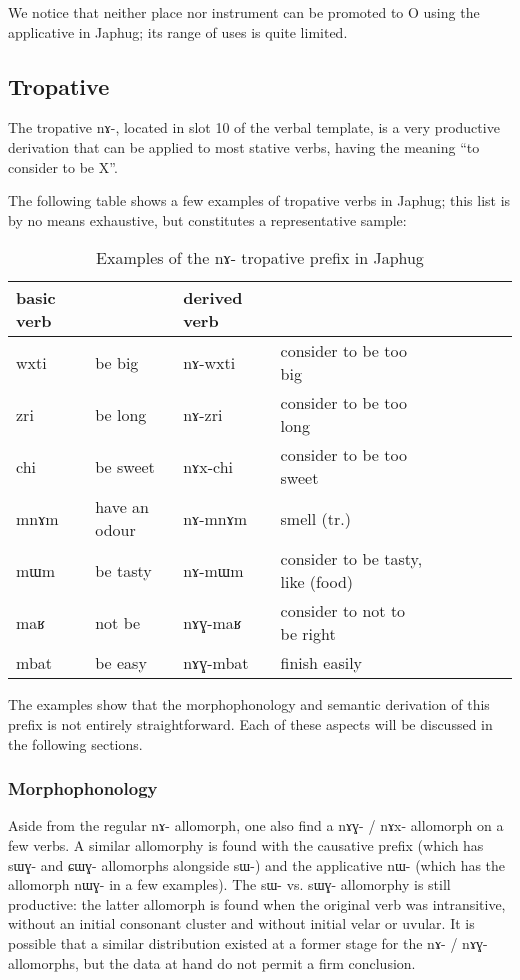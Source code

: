 \documentclass[oldfontcommands,oneside,a4paper,11pt]{memoir}
\newcommand{\ipa}[1]{{\phon #1}} %
\begin{document}
We notice that neither place nor instrument can be promoted to O using the applicative in Japhug; its range of uses is quite limited.

\subsection{Tropative} \label{sub:tropative}
The tropative \ipa{nɤ-}, located in slot 10 of the verbal template, is a very productive derivation that can be applied to most stative verbs, having the meaning ``to consider to be X''. 

The following table shows a few examples of tropative verbs in Japhug; this list is by no means exhaustive, but constitutes a representative sample:
\begin{table}[H]
\caption{Examples of the \ipa{nɤ}- tropative prefix in Japhug}\label{tab:tropative}
\begin{tabular}{lllllllll} \toprule
basic verb  & &derived  verb &\\
\midrule
 \ipa{wxti} & be big & \ipa{nɤ-wxti} & consider to be too big \\
 \ipa{zri} & be long & \ipa{nɤ-zri} & consider to be too long \\
  \ipa{chi} &be sweet & \ipa{nɤx-chi} &consider to be too sweet \\
    \ipa{mnɤm} & have an odour & \ipa{nɤ-mnɤm} & smell (tr.) \\
     \ipa{mɯm} & be tasty & \ipa{nɤ-mɯm} & consider to be tasty, like (food) \\
      \midrule
  \ipa{maʁ} & not be & \ipa{nɤɣ-maʁ} & consider to not to be right \\
  \ipa{mbat} & be easy & \ipa{nɤɣ-mbat} & finish easily \\
\bottomrule
\end{tabular}
\end{table}
The examples show that the morphophonology and semantic derivation of this prefix is not entirely straightforward. Each of these aspects will be discussed in the following sections.

\subsubsection{Morphophonology}


Aside from the regular \ipa{nɤ-} allomorph, one also find a \ipa{nɤɣ-} / \ipa{nɤx-} allomorph on a few verbs. A similar allomorphy is found with the causative prefix (which has \ipa{sɯɣ-} and \ipa{ɕɯɣ-} allomorphs alongside \ipa{sɯ-}) and the applicative \ipa{nɯ-} (which has the allomorph \ipa{nɯɣ-} in a few examples). The  \ipa{sɯ-} vs. \ipa{sɯɣ-} allomorphy is still productive: the latter allomorph is found when the original verb was intransitive, without an initial consonant cluster and without initial velar or uvular. It is possible that a similar distribution existed at a former stage for the \ipa{nɤ-} / \ipa{nɤɣ-} allomorphs, but the data at hand do not permit a firm conclusion.
\end{document}
